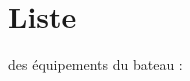\hypertarget{_liste-example}{}\section{Liste}
des équipements du bateau \+:


\begin{DoxyCodeInclude}
\end{DoxyCodeInclude}
 